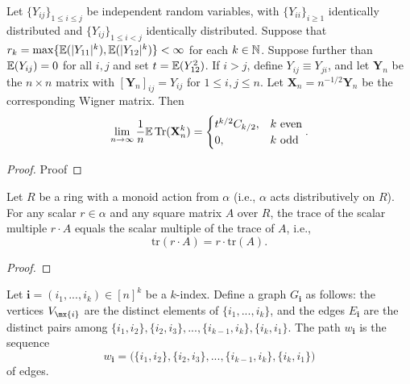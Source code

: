 \begin{proposition}
  \label{prop:matrix_moments_convergence}
  \notready
  Let $\{Y_{ij}\}_{1\le i\le j}$ be independent random variables, with $\{Y_{ii}\}_{i\ge 1}$ identically distributed and $\{Y_{ij}\}_{1\le i<j}$ identically distributed.  Suppose that $r_k = \max\{{\mathbb{E}}(|Y_{11}|^k),{\mathbb{E}}(|Y_{12}|^k)\} <\infty$ for each $k\in{\mathbb{N}}$.  Suppose further than ${\mathbb{E}}(Y_{ij})=0$ for all $i,j$ and set $t={\mathbb{E}}(Y_{12}^2)$.  If $i>j$, define $Y_{ij} \equiv Y_{ji}$, and let $\mathbf{Y}_n$ be the $n\times n$ matrix with $[\mathbf{Y}_n]_{ij} = Y_{ij}$ for $1\le i,j\le n$.  Let $\mathbf{X}_n = n^{-1/2}\mathbf{Y}_n$ be the corresponding Wigner matrix.  Then
\[
\lim_{n\to\infty} \frac{1}{n}{\mathbb{E}}\operatorname{Tr}(\mathbf{X}_n^k) = \begin{cases}
  t^{k/2}C_{k/2}, & k\text{ even} \\
  0, & k\text{ odd}
\end{cases}.
\]
\end{proposition}

\begin{proof}
\notready
Proof
\end{proof}

\iffalse

\begin{lemma}\label{lem:trace_smul}
  \mathlibok %
  Let $R$ be a ring with a monoid action from $\alpha$ (i.e., $\alpha$ acts distributively on $R$).
  For any scalar $r \in \alpha$ and any square matrix $A$ over $R$, the trace of the scalar
  multiple $r \cdot A$ equals the scalar multiple of the trace of $A$, i.e.,
  \[ \text{tr}(r \cdot A) = r \cdot \text{tr}(A). \]
  \end{lemma}

  \begin{proof}\leanok %
  \end{proof}

\begin{definition}
  \label{def:graph}
  \maybelean
  \notready
  Let $\mathbf{i} = (i_1,...,i_k) \in [n]^k$ be a $k$-index. Define a graph $G_\mathbf{i}$ as follows: the
  vertices $V_\mx{i}$ are the distinct elements of $\{i_1,...,i_k\}$, and the edges $E_\mathbf{i}$ are
  the distinct pairs among $\{i_1,i_2\},\{i_2,i_3\},...,\{i_{k-1},i_k\},\{i_k,i_1\}$. The path
  $w_\mathbf{i}$ is the sequence
  $$w_\mathbf{i} = \bigl( \{i_1,i_2\},\{i_2,i_3\},...,\{i_{k-1},i_k\},\{i_k,i_1\} \bigl)$$
  of edges.
\end{definition}

